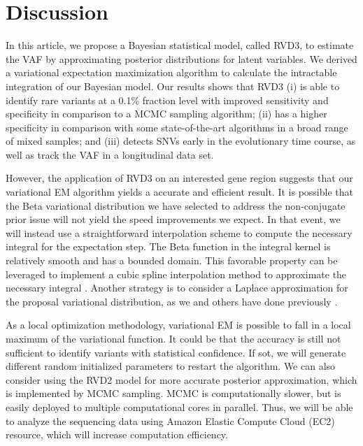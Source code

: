 \documentclass[11pt,reqno]{amsart}
\begin{document}
\section{Discussion}
In this article, we propose a Bayesian statistical model, called RVD3, to estimate the VAF by approximating posterior distributions for latent variables.
We derived a variational expectation maximization algorithm to calculate the intractable integration of our Bayesian model.
Our results shows that RVD3
(i) is able to identify rare variants at a 0.1\% fraction level with improved sensitivity and specificity in comparison to a MCMC sampling algorithm;
(ii) has a higher specificity in comparison with some state-of-the-art algorithms in a broad range of mixed samples;
and (iii) detects SNVs early in the evolutionary time course, as well as track the VAF in a longitudinal data set.

However, the application of RVD3 on an interested gene region suggests that our variational EM algorithm yields a accurate and efficient result.
It is possible that the Beta variational distribution we have selected to address the non-conjugate prior issue will not yield the speed improvements we expect.
In that event, we will instead use a straightforward interpolation scheme to compute the necessary integral for the expectation step.
The Beta function in the integral kernel is relatively smooth and has a bounded domain.
This favorable property can be leveraged to implement a cubic spline interpolation method to approximate the necessary integral \citep{mckinley1998cubic}.
Another strategy is to consider a Laplace approximation for the proposal variational distribution, as we and others have done previously \citep{saddiki2014glad, wang2013variational}.

As a local optimization methodology, variational EM is possible to fall in a local maximum of the variational function.
It could be that the accuracy is still not sufficient to identify variants with statistical confidence.
If sot, we will generate different random initialized parameters to restart the algorithm.
We can also consider using the RVD2 model for more accurate posterior approximation, which is implemented by MCMC sampling.
MCMC is computationally slower, but is easily deployed to multiple computational cores in parallel.
Thus, we will be able to analyze the sequencing data using Amazon Elastic Compute Cloud (EC2) resource, which will increase computation efficiency.
\end{document}
